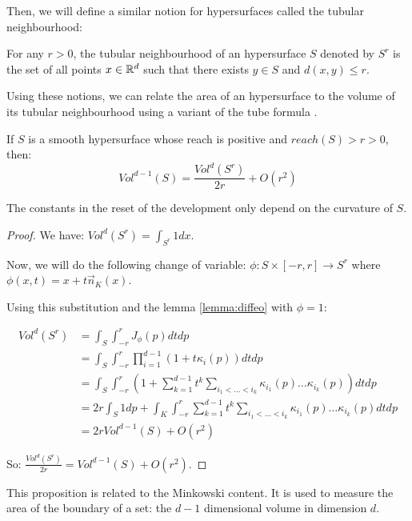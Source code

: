 Then, we will define a similar notion for hypersurfaces called the tubular
neighbourhood:

\begin{definition}
    For any $ r > 0 $, the tubular neighbourhood of an hypersurface $ S $
    denoted by $ S^r $ is the set of all points $ x \in \mathbb{R}^d $ such that there
    exists $ y \in S $ and $ d(x, y) \leq r $.
\end{definition}

Using these notions, we can relate the area of an hypersurface to the volume of
its tubular neighbourhood using a variant of the tube formula \cite{weyl1939volume}.

\begin{proposition}
    \label{prop:comp-offset-area}
    If $ S $ is a smooth hypersurface whose reach is positive and $ reach(S) > r
    > 0 $, then: $$ Vol^{d-1}(S) = \frac{Vol^d(S^r)}{2r} + O(r^2) $$

    The constants in the reset of the development only depend on the curvature
    of $ S $.
\end{proposition}

\begin{proof}
    We have: $ Vol^d(S^r) = \int_{S^r} 1 dx $.

    Now, we will do the following change of variable: $ \phi : S \times [-r, r]
\rightarrow S^r $ where $ \phi(x, t) = x + t \vec{n}_K(x) $.

    Using this substitution and the lemma \ref{lemma:diffeo} with $ \phi = 1 $:

    \begin{align*}
        Vol^d(S^r) &= \int_S \int_{-r}^r J_{\phi}(p) dt dp \\
        &= \int_S \int_{-r}^r \prod_{i=1}^{d-1} (1 + t \kappa_i(p)) dt dp \\
        &= \int_S \int_{-r}^r \left( 1 + \sum_{k=1}^{d-1} t^k \sum_{i_1 < \ldots
                < i_k} \kappa_{i_1}(p) \ldots \kappa_{i_k}(p) \right) dt dp \\
        &= 2r \int_S 1 dp + \int_K \int_{-r}^r \sum_{k=1}^{d-1} t^k \sum_{i_1 < \ldots < i_k} \kappa_{i_1}(p) \ldots \kappa_{i_k}(p) dt dp \\
        &= 2r Vol^{d-1}(S) + O(r^2)
    \end{align*}

    So: $ \frac{Vol^d(S^r)}{2r} = Vol^{d-1}(S) + O(r^2) $.
\end{proof}

This proposition is related to the Minkowski content. It is used to measure the
area of the boundary of a set: the $ d-1 $ dimensional volume in dimension $ d
$.


